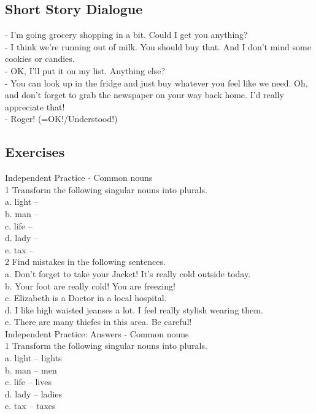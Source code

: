 \documentclass[12pt,a4paper]{article} %
\begin{document}
\subsection{Short Story Dialogue}

	- I'm going grocery	shopping in a bit. Could I get you anything?\\
	- I think we're running out of milk. You should buy that. And I don't mind some	cookies or candies.\\
	- OK, I'll put it on my	list. Anything else?\\
	- You can look up in the fridge	and just buy whatever you feel like we need. Oh, and don't forget to grab the newspaper	on your way back home. I'd really appreciate that!\\
	- Roger! (=OK!/Understood!)\\

\subsection{Exercises}

	Independent Practice - Common nouns\\
		1 Transform the following singular nouns into plurals.\\
			a. light –\\
			b. man –\\
			c. life – \\
			d. lady –\\
			e. tax – \\
		
		2 Find mistakes in the following sentences.\\
			a. Don't forget to take your Jacket! It's really cold outside today.\\
			b. Your foot are really cold! You are freezing!\\
			c. Elizabeth is a Doctor in a local hospital.\\
			d. I like high waisted jeanses a lot. I feel really stylish wearing them.\\
			e. There are many thiefes in this area. Be careful!\\

	Independent Practice: Answers - Common nouns\\
		1 Transform the following singular nouns into plurals.\\
			a. light – lights\\
			b. man – men\\
			c. life – lives\\
			d. lady – ladies\\
			e. tax – taxes\\
\end{document}
